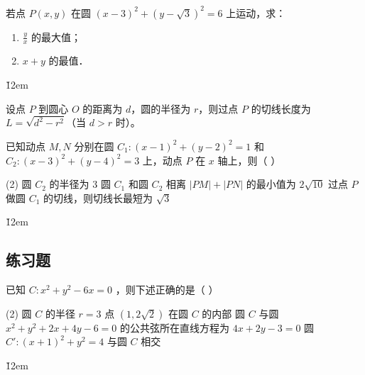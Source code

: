\begin{example}
    若点 $P(x, y)$ 在圆 $(x-3)^2+(y-\sqrt{3})^2=6$ 上运动，求：
    \begin{enumerate}
        \item $\frac{y}{x}$ 的最大值；
        \item $x+y$ 的最值．
    \end{enumerate}
\end{example}

\v{12em}

\begin{theorem}[圆的切线长度]
    设点 $P$ 到圆心 $O$ 的距离为 $d$，圆的半径为 $r$，则过点 $P$ 的切线长度为 $L = \sqrt{d^2 - r^2}$（当 $d > r$ 时）。
\end{theorem}

\begin{example}
    已知动点 $M, N$ 分别在圆 $C_1:(x-1)^2+(y-2)^2=1$ 和 $C_2:(x-3)^2+(y-4)^2=3$ 上，动点 $P$ 在 $x$ 轴上，则（ \hspace{2em} ）
    \begin{tasks}(2)
        \task  圆 $C_2$ 的半径为 3
        \task  圆 $C_1$ 和圆 $C_2$ 相离
        \task  $|P M|+|P N|$ 的最小值为 $2 \sqrt{10}$
        \task  过点 $P$ 做圆 $C_1$ 的切线，则切线长最短为 $\sqrt{3}$
    \end{tasks}
\end{example}

\v{12em}

\subsection*{练习题}

\begin{example}
    已知 $C: x^2+y^2-6 x=0$ ，则下述正确的是（ \hspace{2em} ）
    \begin{tasks}(2)
        \task 圆 $C$ 的半径 $r=3$
        \task 点 $(1,2 \sqrt{2})$ 在圆 $C$ 的内部
        \task* 圆 $C$ 与圆 $x^2+y^2+2 x+4 y-6=0$ 的公共弦所在直线方程为 $4 x+2 y-3=0$
        \task 圆 $C':(x+1)^2+y^2=4$ 与圆 $C$ 相交
    \end{tasks}
\end{example}

\v{12em}

